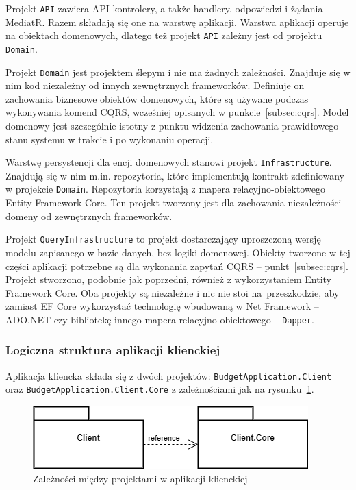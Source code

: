 Projekt \texttt{API} zawiera API kontrolery, a także handlery, odpowiedzi i żądania MediatR. Razem składają się one na warstwę aplikacji. Warstwa aplikacji operuje na obiektach domenowych, dlatego też projekt \texttt{API} zależny jest od projektu \texttt{Domain}.

Projekt \texttt{Domain} jest projektem ślepym i nie ma żadnych zależności. Znajduje się w nim kod niezależny od innych zewnętrznych frameworków. Definiuje on zachowania biznesowe obiektów domenowych, które są używane podczas wykonywania komend CQRS, wcześniej opisanych w punkcie~\ref{subsec:cqrs}. Model domenowy jest szczególnie istotny z punktu widzenia zachowania prawidłowego stanu systemu w trakcie i po wykonaniu operacji.

Warstwę persystencji dla encji domenowych stanowi projekt \texttt{Infrastructure}. Znajdują się w nim m.in. repozytoria, które implementują kontrakt zdefiniowany w projekcie \texttt{Domain}. Repozytoria korzystają z mapera relacyjno-obiektowego Entity Framework Core. Ten projekt tworzony jest dla zachowania niezależności domeny od zewnętrznych frameworków.

Projekt \texttt{QueryInfrastructure} to projekt dostarczający uproszczoną wersję modelu zapisanego w bazie danych, bez logiki domenowej. Obiekty tworzone w tej części aplikacji potrzebne są dla wykonania zapytań CQRS -- punkt~\ref{subsec:cqrs}. Projekt stworzono, podobnie jak poprzedni, również z wykorzystaniem Entity Framework Core. Oba projekty są niezależne i nic nie stoi na~przeszkodzie, aby zamiast EF Core wykorzystać technologię wbudowaną w Net Framework -- ADO.NET czy bibliotekę innego mapera relacyjno-obiektowego -- \texttt{Dapper}.

\subsubsection{Logiczna struktura aplikacji klienckiej}

Aplikacja kliencka składa się z dwóch projektów: \texttt{BudgetApplication.Client} oraz \texttt{BudgetApplication.Client.Core} z zależnościami jak na rysunku~\ref{fig:client-arch}.

\begin{figure}[ht]
	\centering
	\includegraphics[scale=.55]{rys04/client-arch.png}
	\caption{Zależności między projektami w aplikacji klienckiej}
	\label{fig:client-arch}
\end{figure}


